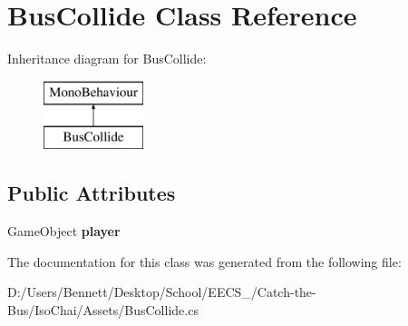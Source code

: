 \hypertarget{class_bus_collide}{}\section{Bus\+Collide Class Reference}
\label{class_bus_collide}
Inheritance diagram for Bus\+Collide\+:\begin{figure}[H]
\begin{center}
\leavevmode
\includegraphics[height=2.000000cm]{class_bus_collide}
\end{center}
\end{figure}
\subsection*{Public Attributes}
\begin{DoxyCompactItemize}
\item 
\mbox{\label{class_bus_collide_aafdccfea486ab7e4782a9412252ecf03}} 
Game\+Object {\bfseries player}
\end{DoxyCompactItemize}


The documentation for this class was generated from the following file\+:\begin{DoxyCompactItemize}
\item 
D\+:/\+Users/\+Bennett/\+Desktop/\+School/\+E\+E\+C\+S\+\_/\+Catch-\/the-\/\+Bus/\+Iso\+Chai/\+Assets/Bus\+Collide.\+cs\end{DoxyCompactItemize}
